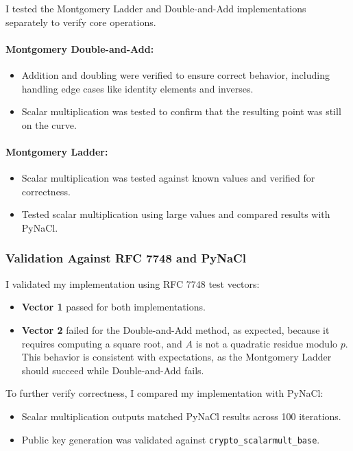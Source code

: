 \documentclass[twoside,a4paper,12pt]{article}
\begin{document}
I tested the Montgomery Ladder and Double-and-Add implementations separately to verify core operations.

\paragraph{Montgomery Double-and-Add:}
\begin{itemize}
    \item Addition and doubling were verified to ensure correct behavior, including handling edge cases like identity elements and inverses.
    \item Scalar multiplication was tested to confirm that the resulting point was still on the curve.
\end{itemize}

\paragraph{Montgomery Ladder:}
\begin{itemize}
    \item Scalar multiplication was tested against known values and verified for correctness.
    \item Tested scalar multiplication using large values and compared results with PyNaCl.
\end{itemize}

\subsubsection{Validation Against RFC 7748 and PyNaCl}

I validated my implementation using RFC 7748 test vectors:
\begin{itemize}
    \item \textbf{Vector 1} passed for both implementations.
    \item \textbf{Vector 2} failed for the Double-and-Add method, as expected, because it requires computing a square root, and \( A \) is not a quadratic residue modulo \( p \). This behavior is consistent with expectations, as the Montgomery Ladder should succeed while Double-and-Add fails.

\end{itemize}

To further verify correctness, I compared my implementation with PyNaCl:
\begin{itemize}
    \item {Scalar multiplication outputs} matched PyNaCl results across 100 iterations.
    \item {Public key generation} was validated against \texttt{crypto\_scalarmult\_base}.
\end{itemize}
\end{document}

